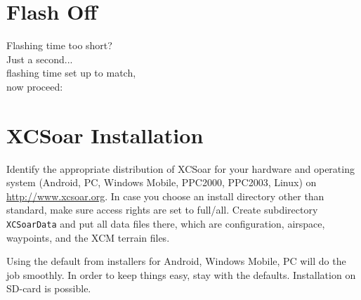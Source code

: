 \documentclass[english,a4paper,12pt,utf8]{scrreprt}
\begin{document}
\section*{{\color[rgb]{.9,.85,0}Flash} Off}

\vspace{2em}
\hspace*{1cm} Flashing time too short?\\
\hspace*{4cm} Just a second...\\
\hspace*{6cm} flashing time set up to match,\\
\hspace*{10cm} now proceed:


\setlength{\parskip}{0.3\baselineskip}
\newpage
\section{XCSoar Installation}\label{ch:XCSinstall}


Identify the appropriate distribution of XCSoar for your hardware and
operating system \textsf{(Android, PC, Windows Mobile, PPC2000, PPC2003, Linux)}
on \url{http://www.xcsoar.org}.
In case you choose an install directory other than standard, make sure access
rights are set to full/all. Create subdirectory \texttt{XCSoarData} and put all
data files there, which are configuration, airspace, waypoints, and the XCM
terrain files.

Using the default from installers for Android, Windows Mobile, PC will do the
job smoothly.  In order to keep things easy, stay with the defaults.
Installation on SD-card is possible.
\end{document}
